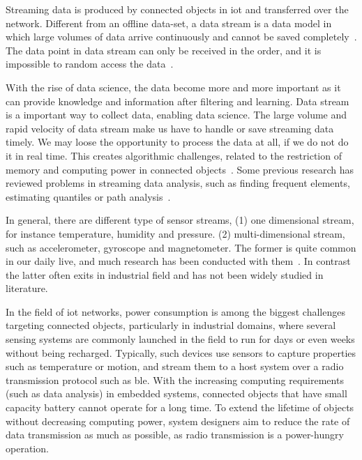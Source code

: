 Streaming data is produced by connected objects in \acrshort{iot} and
transferred over the network. Different from an offline data-set, a data stream
is a data model in which large volumes of data arrive continuously and cannot be
saved completely~\cite{o2002streaming}. The data point in data stream can only
be received in the order, and it is impossible to random access the
data~\cite{o2002streaming}.

With the rise of data science, the data become more and more important as it can
provide knowledge and information after filtering and learning. Data stream is a
important way to collect data, enabling data science. The large volume and rapid
velocity of data stream make us have to handle or save streaming data timely. We
may loose the opportunity to process the data at all, if we do not do it in real
time. This creates algorithmic challenges, related to the restriction of memory
and computing power in connected objects~\cite{o2002streaming}. Some previous
research has reviewed problems in streaming data analysis, such as finding
frequent elements, estimating quantiles or path
analysis~\cite{kejariwal2015real}.

In general, there are different type of sensor streams, (1) one dimensional
stream, for instance temperature, humidity and pressure. (2) multi-dimensional
stream, such as accelerometer, gyroscope and magnetometer. The former is quite
common in our daily live, and much research has been conducted with
them~\cite{kulwicki1991humidity, oprea2009temperature, woyessa2016temperature}.
In contrast the latter often exits in industrial field and has not been widely
studied in literature.





In the field of \acrshort{iot} networks, power consumption is among the biggest
challenges targeting connected objects, particularly in industrial domains,
where several sensing systems are commonly launched in the field to run for days
or even weeks without being recharged. Typically, such devices use sensors to
capture properties such as temperature or motion, and stream them to a host
system over a radio transmission protocol such as \acrfull{ble}. With the
increasing computing requirements (such as data analysis) in embedded systems,
connected objects that have small capacity battery cannot operate for a long
time. To extend the lifetime of objects without decreasing computing power,
system designers aim to reduce the rate of data transmission as much as
possible, as radio transmission is a power-hungry operation.


